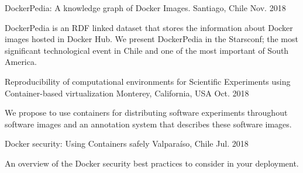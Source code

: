 \begin{cventries}
   {DockerPedia: A knowledge graph of Docker Images.}
  {Santiago, Chile} {Nov. 2018} { \begin{cvitems}\item {DockerPedia is an RDF linked dataset that stores the information about Docker images hosted in Docker Hub. We present DockerPedia in the Starsconf; the most significant technological event in Chile and one of the most important of South America.}\end{cvitems} }

  {Reproducibility of computational environments for Scientific Experiments using Container-based virtualization}
  {Monterey, California, USA} {Oct. 2018}
  { \begin{cvitems}\item {We propose to use containers for distributing software experiments throughout software images and an annotation system that describes these software images.}\end{cvitems} }

   {Docker security: Using Containers safely}
  {Valparaíso, Chile} {Jul. 2018} { \begin{cvitems}\item {An overview of the Docker security best practices to consider in your deployment.}\end{cvitems} }
\end{cventries}